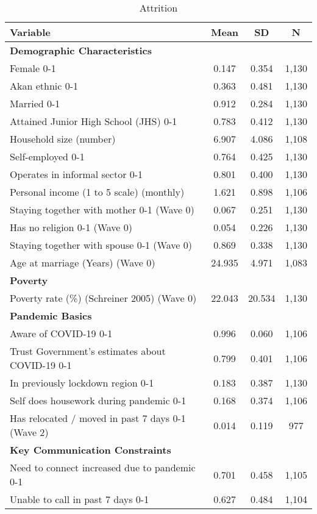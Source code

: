 \begin{ThreePartTable}
\begin{table}[tbp]\centering
\def\sym#1{\ifmmode^{#1}\else\(^{#1}\)\fi}
\caption{Attrition}
\begin{tabular}{lccc}
\hline
Variable & Mean & SD & N \\
\hline\hline
\textbf{Demographic Characteristics} & & & \\ 
Female 0-1 & 0.147 & 0.354 & 1,130 \\ 
Akan ethnic 0-1 & 0.363 & 0.481 & 1,130 \\ 
Married 0-1 & 0.912 & 0.284 & 1,130 \\ 
Attained Junior High School (JHS) 0-1 & 0.783 & 0.412 & 1,130 \\ 
Household size (number) & 6.907 & 4.086 & 1,108 \\ 
Self-employed 0-1 & 0.764 & 0.425 & 1,130 \\ 
Operates in informal sector 0-1 & 0.801 & 0.400 & 1,130 \\ 
Personal income (1 to 5 scale) (monthly) & 1.621 & 0.898 & 1,106 \\ 
Staying together with mother 0-1 (Wave 0) & 0.067 & 0.251 & 1,130 \\ 
Has no religion 0-1 (Wave 0) & 0.054 & 0.226 & 1,130 \\ 
Staying together with spouse 0-1 (Wave 0) & 0.869 & 0.338 & 1,130 \\ 
Age at marriage (Years) (Wave 0) & 24.935 & 4.971 & 1,083 \\ 
\textbf{Poverty} & & & \\ 
Poverty rate (\%) (Schreiner 2005) (Wave 0) & 22.043 & 20.534 & 1,130 \\ 
\textbf{Pandemic Basics} & & & \\ 
Aware of COVID-19 0-1 & 0.996 & 0.060 & 1,106 \\ 
Trust Government's estimates about COVID-19 0-1 & 0.799 & 0.401 & 1,106 \\ 
In previously lockdown region 0-1 & 0.183 & 0.387 & 1,130 \\ 
Self does housework during pandemic 0-1 & 0.168 & 0.374 & 1,106 \\ 
Has relocated / moved in past 7 days 0-1 (Wave 2) & 0.014 & 0.119 & 977 \\ 
\textbf{Key Communication Constraints} & & & \\ 
Need to connect increased due to pandemic 0-1 & 0.701 & 0.458 & 1,105 \\ 
Unable to call in past 7 days 0-1 & 0.627 & 0.484 & 1,104 \\ 

\end{tabular}
\end{table}
\end{ThreePartTable}

